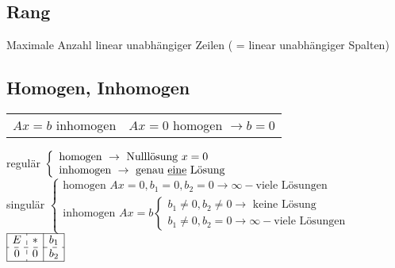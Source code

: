\subsection{Rang}
	Maximale Anzahl linear unabhängiger Zeilen ( = linear unabhängiger Spalten)

\subsection{Homogen, Inhomogen}
	\begin{tabular}{ll}
		$Ax = b$ inhomogen & $Ax = 0$ homogen $\rightarrow b=0$\\
	\end{tabular}

	regulär $\left\lbrace\begin{array}{l}
		\text{homogen } \rightarrow \text{ Nulllösung } x=0\\
		\text{inhomogen } \rightarrow \text{ genau \underline{eine} Lösung }\end{array}\right.$ \\
	
	singulär $\left\lbrace\begin{array}{l}
		\text{homogen } Ax=0, b_1=0, b_2=0 \rightarrow \infty-\text{viele Lösungen}\\
		\text{inhomogen } Ax = b \left\lbrace\begin{array}{l}
			b_1 \neq 0, b_2 \neq 0 \rightarrow \text{ keine Lösung}\\
			b_1 \neq 0, b_2 =0 \rightarrow \infty-\text{viele Lösungen} \end{array}\right. \end{array}\right.$ \qquad 
		$ \begin{array}{|c : c|c|}
			\hline E & * & b_1 \\
			\hdashline 0 & 0 & b_2 \\
			\hline \end{array}$ \\

